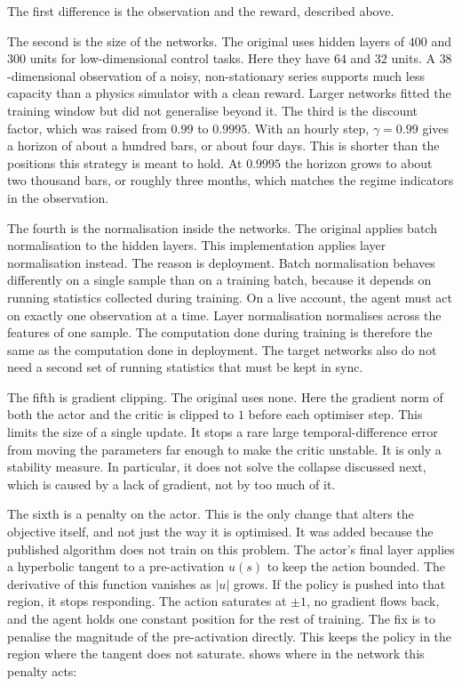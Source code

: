

The first difference is the observation and the reward, described above.

The second is the size of the networks. The original uses hidden layers of $400$ and $300$ units for low-dimensional control tasks. Here they have $64$ and $32$ units. A $38$-dimensional observation of a noisy, non-stationary series supports much less capacity than a physics simulator with a clean reward. Larger networks fitted the training window but did not generalise beyond it. The third is the discount factor, which was raised from $0.99$ to $0.9995$. With an hourly step, $\gamma = 0.99$ gives a horizon of about a hundred bars, or about four days. This is shorter than the positions this strategy is meant to hold. At $0.9995$ the horizon grows to about two thousand bars, or roughly three months, which matches the regime indicators in the observation.

The fourth is the normalisation inside the networks. The original applies batch normalisation to the hidden layers. This implementation applies layer normalisation instead. The reason is deployment. Batch normalisation behaves differently on a single sample than on a training batch, because it depends on running statistics collected during training. On a live account, the agent must act on exactly one observation at a time. Layer normalisation normalises across the features of one sample. The computation done during training is therefore the same as the computation done in deployment. The target networks also do not need a second set of running statistics that must be kept in sync.

The fifth is gradient clipping. The original uses none. Here the gradient norm of both the actor and the critic is clipped to $1$ before each optimiser step. This limits the size of a single update. It stops a rare large temporal-difference error from moving the parameters far enough to make the critic unstable. It is only a stability measure. In particular, it does not solve the collapse discussed next, which is caused by a lack of gradient, not by too much of it.

The sixth is a penalty on the actor. This is the only change that alters the objective itself, and not just the way it is optimised. It was added because the published algorithm does not train on this problem. The actor's final layer applies a hyperbolic tangent to a pre-activation $u(s)$ to keep the action bounded. The derivative of this function vanishes as $|u|$ grows. If the policy is pushed into that region, it stops responding. The action saturates at $\pm 1$, no gradient flows back, and the agent holds one constant position for the rest of training. The fix is to penalise the magnitude of the pre-activation directly. This keeps the policy in the region where the tangent does not saturate.  shows where in the network this penalty acts:

